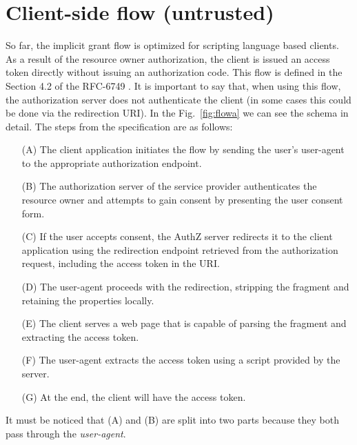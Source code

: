 \section{Client-side flow (untrusted)}
So far, the implicit grant flow is optimized for scripting language based clients. As a result of the resource owner authorization, the client is issued an access token directly without issuing an authorization code. This flow is defined in the Section 4.2 of the RFC-6749 \cite{RFC6749}. It is important to say that, when using this flow, the authorization server does not authenticate the client (in some cases this could be done via the redirection URI). In the Fig.~\ref{fig:flowa} we can see the schema in detail. The steps from the specification are as follows:

\begin{itemize}
    \item[(A)]The client application initiates the flow by sending the user's user-agent to the appropriate authorization endpoint.
    \item[(B)]The authorization server of the service provider authenticates the resource owner and attempts to gain consent by presenting the user consent form.
    \item[(C)]If the user accepts consent, the AuthZ server redirects it to the client application using the redirection endpoint retrieved from the authorization request, including the access token in the URI.
    \item[(D)]The user-agent proceeds with the redirection, stripping the fragment and retaining the properties locally.
    \item[(E)]The client serves a web page that is capable of parsing the fragment and extracting the access token.
    \item[(F)]The user-agent extracts the access token using a script provided by the server.
    \item[(G)] At the end, the client will have the access token.
\end{itemize}

It must be noticed that (A) and (B) are split into two parts because they both pass through the \textit{user-agent}.

